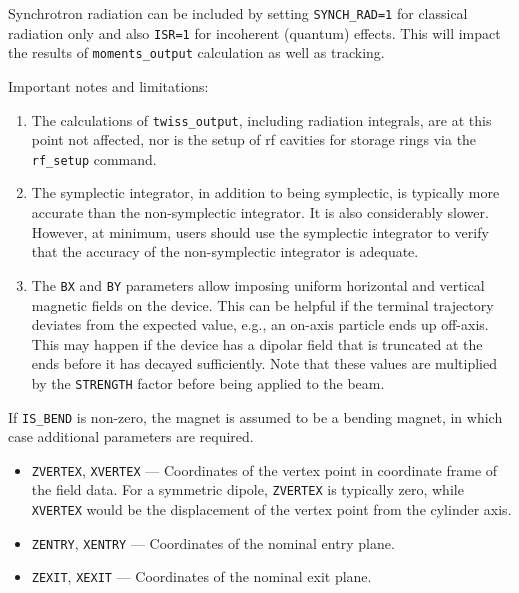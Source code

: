 Synchrotron radiation can be included by setting \verb|SYNCH_RAD=1| for classical radiation only and
also \verb|ISR=1| for incoherent (quantum) effects. 
This will impact the results of \verb|moments_output| calculation as well as tracking.

Important notes and limitations:
\begin{enumerate}
\item The calculations of \verb|twiss_output|, including radiation integrals, are at this point not affected,
nor is the setup of rf cavities for storage rings via the \verb|rf_setup| command.
\item The symplectic integrator, in addition to being symplectic, is typically more accurate than the non-symplectic integrator.
  It is also considerably slower.
  However, at minimum, users should use the symplectic integrator to verify that the accuracy of the non-symplectic integrator
  is adequate.
\item The \verb|BX| and \verb|BY| parameters allow imposing uniform horizontal and vertical magnetic fields 
  on the device.
  This can be helpful if the terminal trajectory deviates from the expected value, e.g., an on-axis particle  
  ends up off-axis. This may happen if the device has
  a dipolar field that is truncated at the ends before it has decayed sufficiently.
  Note that these values are multiplied by the \verb|STRENGTH| factor before being applied to the beam.
\end{enumerate}

If \verb|IS_BEND| is non-zero, the magnet is assumed to be a bending magnet, in which case additional
parameters are required.
\begin{itemize}
\item \verb|ZVERTEX|, \verb|XVERTEX| --- Coordinates of the vertex point in coordinate frame of the field data.
  For a symmetric dipole, \verb|ZVERTEX| is typically zero, while \verb|XVERTEX| would be the displacement of
  the vertex point from the cylinder axis.
\item \verb|ZENTRY|, \verb|XENTRY| --- Coordinates of the nominal entry plane.
\item \verb|ZEXIT|, \verb|XEXIT| --- Coordinates of the nominal exit plane.
\end{itemize}
